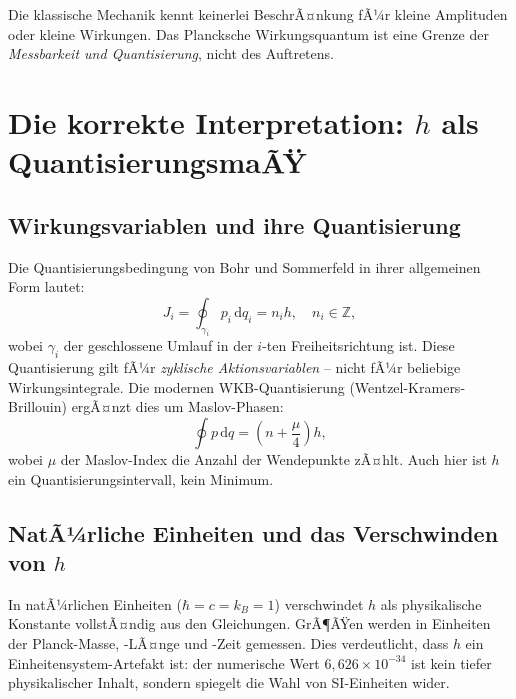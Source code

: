 ﻿\documentclass[12pt,a4paper]{article}
\theoremstyle{plain}
\theoremstyle{definition}
\theoremstyle{remark}
\begin{document}
Die klassische Mechanik kennt keinerlei BeschrÃ¤nkung fÃ¼r kleine Amplituden oder kleine
Wirkungen. Das Plancksche Wirkungsquantum ist eine Grenze der \emph{Messbarkeit und
Quantisierung}, nicht des Auftretens.

\section{Die korrekte Interpretation: $h$ als QuantisierungsmaÃŸ}

\subsection{Wirkungsvariablen und ihre Quantisierung}

Die Quantisierungsbedingung von Bohr und Sommerfeld in ihrer allgemeinen Form lautet:
\begin{equation}
  J_i = \oint_{\gamma_i} p_i\,\mathrm{d}q_i = n_i h, \quad n_i \in \mathbb{Z},
\end{equation}
wobei $\gamma_i$ der geschlossene Umlauf in der $i$-ten Freiheitsrichtung ist. Diese
Quantisierung gilt fÃ¼r \emph{zyklische Aktionsvariablen} -- nicht fÃ¼r beliebige
Wirkungsintegrale. Die modernen WKB-Quantisierung (Wentzel-Kramers-Brillouin) ergÃ¤nzt dies um Maslov-Phasen:
\begin{equation}
  \oint p\,\mathrm{d}q = \left(n + \frac{\mu}{4}\right)h,
\end{equation}
wobei $\mu$ der Maslov-Index die Anzahl der Wendepunkte zÃ¤hlt. Auch hier ist $h$ ein
Quantisierungsintervall, kein Minimum.

\subsection{NatÃ¼rliche Einheiten und das Verschwinden von $h$}

In natÃ¼rlichen Einheiten ($\hbar = c = k_B = 1$) verschwindet $h$ als physikalische
Konstante vollstÃ¤ndig aus den Gleichungen. GrÃ¶ÃŸen werden in Einheiten der Planck-Masse,
-LÃ¤nge und -Zeit gemessen. Dies verdeutlicht, dass $h$ ein Einheitensystem-Artefakt ist:
der numerische Wert $6{,}626\times 10^{-34}$ ist kein tiefer physikalischer Inhalt,
sondern spiegelt die Wahl von SI-Einheiten wider.
\end{document}
